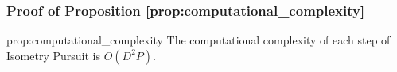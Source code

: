 
\subsubsection{Proof of Proposition \ref{prop:computational_complexity}}
\label{proof:computational_complexity}

\begin{restatedproposition}{prop:computational_complexity}
The computational complexity of each step of Isometry Pursuit is $O(D^2P)$.
\end{restatedproposition}

